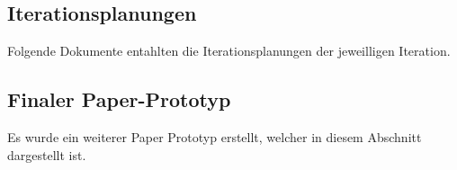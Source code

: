 \documentclass[12pt,a4paper]{article}
\begin{document}
\newpage
\vspace*{40mm}
\subsection{Iterationsplanungen}

Folgende Dokumente entahlten die Iterationsplanungen der jeweilligen Iteration.





\newpage
\vspace*{40mm}
\subsection{Finaler Paper-Prototyp}

Es wurde ein weiterer Paper Prototyp erstellt, welcher in diesem Abschnitt dargestellt ist.
\end{document}
